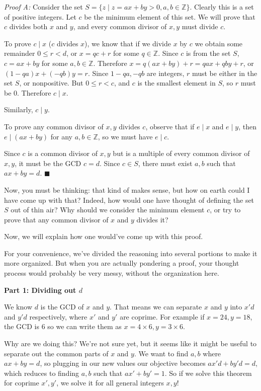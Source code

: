 \documentclass[11pt]{article}
\begin{document}
    \textit{Proof A:} Consider the set $S=\{z\mid z=ax+by>0, a,b\in\mathbb{Z}\}$. Clearly 
    this is a set of positive integers. Let $c$ be the minimum element of this set. We
    will prove that $c$ divides both $x$ and $y$, and every common divisor of $x,y$ must
    divide $c$.
    
    To prove $c\mid x$ ($c$ divides $x$), we know that if we divide $x$ by $c$ we obtain
    some remainder $0\leq r<d$, or $x=qc+r$ for some $q\in\mathbb{Z}$. Since $c$ is from
    the set $S$, $c=ax+by$ for some $a,b\in\mathbb Z$. Therefore $x=q(ax+by)+r=qax+qby+r$,
    or $(1-qa)x+(-qb)y=r$. Since $1-qa,-qb$ are integers, $r$ must be either in the set
    $S$, or nonpositive. But $0\leq r<c$, and $c$ is the smallest element in $S$, so $r$
    must be 0. Therefore $c\mid x$.
    
    Similarly, $c\mid y$.
    
    To prove any common divisor of $x,y$ divides $c$, observe that if $e\mid x$ and
    $e\mid y$, then $e\mid(ax+by)$ for any $a,b\in\mathbb Z$, so we must have $e\mid c$.
    
    Since $c$ is a common divisor of $x,y$ but is a multiple of every common divisor
    of $x,y$, it must be the GCD $c=d$. Since $c\in S$, there must exist $a,b$ such that
    $ax+by=d$. $\blacksquare$
    
    Now, you must be thinking: that kind of makes sense, but how on earth could I have
    come up with that? Indeed, how would one have thought of defining the set $S$ out
    of thin air? Why should we consider the minimum element $c$, or try to prove that
    any common divisor of $x$ and $y$ divides it?
    
    Now, we will explain how one would've come up with this proof.
    
    
    For your convenience, we've divided the reasoning into several portions to make it
    more organized. But when you are actually pondering a proof, your thought process
    would probably be very messy, without the organization here.
    
    \textbf{Part 1: Dividing out $d$}
    
    We know $d$ is the GCD of $x$ and $y$. That means we can separate $x$ and $y$ into
    $x'd$ and $y'd$ respectively, where $x'$ and $y'$ are coprime. For example if
    $x=24,y=18$, the GCD is 6 so we can write them as $x=4\times6,y=3\times6$.
    
    Why are we doing this? We're not sure yet, but it seems like it might be useful
    to separate out the common parts of $x$ and $y$. We want to find $a,b$ where 
    $ax+by=d$, so plugging in our new values our objective becomes $ax'd+by'd=d$,
    which reduces to finding $a,b$ such that $ax'+by'=1$. So if we solve this
    theorem for coprime $x',y'$, we solve it for all general integers $x,y$!
    
\end{document}

